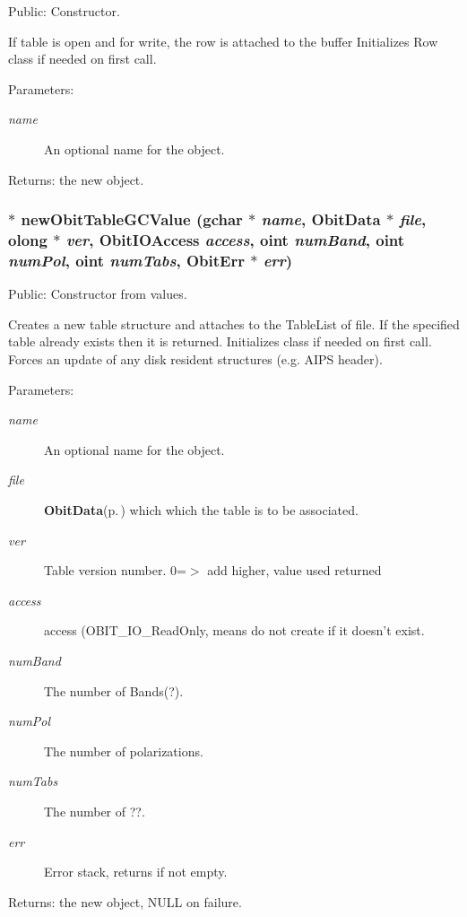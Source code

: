 Public: Constructor. 

If table is open and for write, the row is attached to the buffer Initializes Row class if needed on first call. \begin{Desc}
\item[Parameters:]
\begin{description}
\item[{\em name}]An optional name for the object. \end{description}
\end{Desc}
\begin{Desc}
\item[Returns:]the new object. \end{Desc}
\subsubsection{$\ast$ new\-Obit\-Table\-GCValue (gchar $\ast$ {\em name}, {\bf Obit\-Data} $\ast$ {\em file}, {\bf olong} $\ast$ {\em ver}, Obit\-IOAccess {\em access}, {\bf oint} {\em num\-Band}, {\bf oint} {\em num\-Pol}, {\bf oint} {\em num\-Tabs}, {\bf Obit\-Err} $\ast$ {\em err})}\label{ObitTableGC_8h_a12}


Public: Constructor from values. 

Creates a new table structure and attaches to the Table\-List of file. If the specified table already exists then it is returned. Initializes class if needed on first call. Forces an update of any disk resident structures (e.g. AIPS header). \begin{Desc}
\item[Parameters:]
\begin{description}
\item[{\em name}]An optional name for the object. \item[{\em file}]{\bf Obit\-Data}{\rm (p.\,\pageref{structObitData})} which which the table is to be associated. \item[{\em ver}]Table version number. 0=$>$ add higher, value used returned \item[{\em access}]access (OBIT\_\-IO\_\-Read\-Only, means do not create if it doesn't exist. \item[{\em num\-Band}]The number of Bands(?). \item[{\em num\-Pol}]The number of polarizations. \item[{\em num\-Tabs}]The number of ??. \item[{\em err}]Error stack, returns if not empty. \end{description}
\end{Desc}
\begin{Desc}
\item[Returns:]the new object, NULL on failure. \end{Desc}
